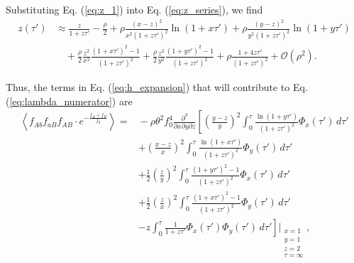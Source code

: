 \documentclass[11pt]{article}
\begin{document}
Substituting Eq. (\ref{eq:z_1}) into Eq. (\ref{eq:z_series}), we find
\begin{align}
    z(\tau') &\approx \frac{z}{1+z\tau'} 
    - \frac{\rho}{2}
    + \rho\frac{(x-z)^2}{x^2(1+z\tau')^2}\ln(1+x\tau')
    + \rho\frac{(y-z)^2}{y^2(1+z\tau')^2}\ln(1+y\tau') \\\nonumber
    &\quad + \frac{\rho}{2}\frac{z^2}{x^2}\frac{(1+x\tau')^2-1}{(1+z\tau')^2}
    + \frac{\rho}{2}\frac{z^2}{y^2}\frac{(1+y\tau')^2-1}{(1+z\tau')^2}
    + \rho\frac{1+4z\tau'}{(1+z\tau')^2} + \mathcal{O}(\rho^2).
\end{align}

Thus, the terms in Eq. (\ref{eq:h_expansion}) that will contribute to Eq. (\ref{eq:lambda_numerator}) are 
\begin{align}\label{eq:lambda_num_contribution}
    \left\langle f_{Ab}f_{aB}f_{AB}\cdot e^{-\frac{f_{A}+f_{B}}{f_0}}\right\rangle =&{} -\rho \theta^2 f_0^4 \frac{\partial^3}{\partial x \partial y \partial z} \left[ \left(\frac{y-z}{y}\right)^2 \int_0^{\tau} \frac{\ln(1+y\tau')}{(1+z\tau')^2} \Phi_x(\tau') \,d\tau' \right. \\\nonumber
    &+ \left. \left(\frac{x-z}{x}\right)^2 \int_0^{\tau} \frac{\ln(1+x\tau')}{(1+z\tau')^2} \Phi_y(\tau') \,d\tau' \right. \\\nonumber
    &+ \left. \frac{1}{2} \left(\frac{z}{y}\right)^2 \int_0^{\tau}  \frac{(1+y\tau')^2-1}{(1+z\tau')^2}\Phi_x(\tau') \,d\tau' \right. \\\nonumber
    &+ \left. \frac{1}{2} \left(\frac{z}{x}\right)^2 \int_0^{\tau} \frac{(1+x\tau')^2-1}{(1+z\tau')^2}\Phi_y(\tau') \,d\tau' \right. \\\nonumber
    &- \left.  z\int_0^{\tau} \frac{1}{1+z\tau'} \Phi_x(\tau')\Phi_y(\tau') \,d\tau'\right]\Bigg\vert_{\substack{x=1 \\ y=1 \\ z=2 \\ \tau=\infty}},

\end{align}
\end{document}
